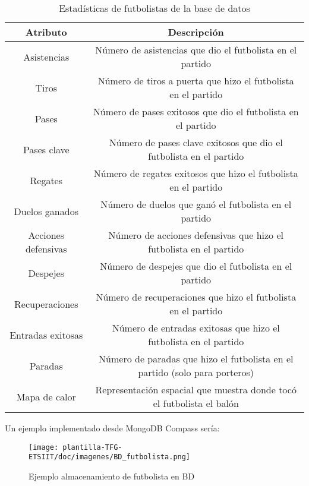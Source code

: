 \begin{table}[H]
    \centering
    \begin{tabular}{|c|c|}
        \hline
        \textbf{Atributo} & \textbf{Descripción} \\
        \hline
        Asistencias & Número de asistencias que dio el futbolista en el partido \\
        \hline
        Tiros & Número de tiros a puerta que hizo el futbolista en el partido \\
        \hline
        Pases & Número de pases exitosos que dio el futbolista en el partido \\
        \hline
        Pases clave & Número de pases clave exitosos que dio el futbolista en el partido \\
        \hline
        Regates & Número de regates exitosos que hizo el futbolista en el partido \\
        \hline
        Duelos ganados & Número de duelos que ganó el futbolista en el partido \\
        \hline
        Acciones defensivas & Número de acciones defensivas que hizo el futbolista en el partido \\
        \hline
        Despejes & Número de despejes que dio el futbolista en el partido \\
        \hline
        Recuperaciones & Número de recuperaciones que hizo el futbolista en el partido \\
        \hline
        Entradas exitosas & Número de entradas exitosas que hizo el futbolista en el partido \\
        \hline
        Paradas & Número de paradas que hizo el futbolista en el partido (solo para porteros)\\
        \hline
        Mapa de calor & Representación espacial que muestra donde tocó el futbolista el balón \\
        \hline
    \end{tabular}
    \caption{Estadísticas de futbolistas de la base de datos}
    \label{tab:ejemplo}
\end{table}

Un ejemplo implementado desde MongoDB Compass sería:
\begin{figure}[H]
    \centering
    \texttt{[image: plantilla-TFG-ETSIIT/doc/imagenes/BD\_futbolista.png]}
    \caption{Ejemplo almacenamiento de futbolista en BD}
    \label{fig:etiqueta-imagen}
\end{figure}

